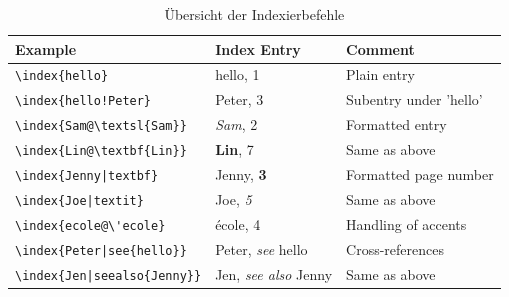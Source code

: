 \documentclass[11pt, a4paper]{article}
\begin{document}
\begin{table}[h!]
\centering
\caption{Übersicht der Indexierbefehle\label{tab:Indexbefehle}}
\begin{tabular}{lll}
\toprule
Example &	Index Entry	 & Comment\\
\midrule
\verb+\index{hello}+ &	hello, 1	& Plain entry \\
\verb+\index{hello!Peter}+	&  Peter, 3	 &Subentry under 'hello'\\
\verb+\index{Sam@\textsl{Sam}}+&	\textsl{Sam}, 2	&Formatted entry\\
\verb+\index{Lin@\textbf{Lin}}	+&	\textbf{Lin}, 7	&Same as above\\
\verb+\index{Jenny|textbf}+&	Jenny, \textbf{3}	&Formatted page number\\
\verb+\index{Joe|textit}+&	Joe, \textit{5}	&Same as above\\
\verb+\index{ecole@\'ecole}+&	école, 4&	Handling of accents\\
\verb+\index{Peter|see{hello}}+&	Peter, \textit{see} hello	&Cross-references\\
\verb+\index{Jen|seealso{Jenny}}+ &	Jen, \textit{see also} Jenny	&Same as above\\
\bottomrule

\end{tabular}

\end{table}%

\newpage

\printbibliography
\printindex
\end{document}

